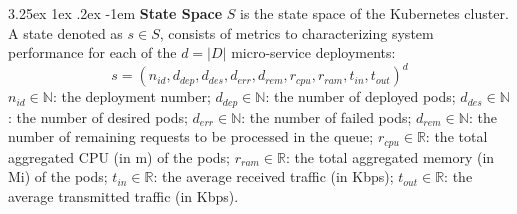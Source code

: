 \documentclass[conference]{IEEEtran}
\makeatletter
\renewcommand\paragraph{\@startsection{paragraph}{5}{\z@}%
  {3.25ex \@plus1ex \@minus.2ex}%
  {-1em}%
  {\normalfont\normalsize\bfseries}}
\makeatother
\begin{document}
\noindent \paragraph{\textbf{State Space}} $S$ is the state space of the Kubernetes cluster. A state denoted as $s \in S$, consists of metrics to characterizing system performance for each of the $d = |D|$ micro-service deployments:
$$
s = (n_{id}, d_{dep}, d_{des}, d_{err}, d_{rem}, r_{cpu}, r_{ram}, t_{in}, t_{out})^d
$$
$n_{id} \in \mathbb{N}$: the deployment number; \quad
$d_{dep} \in \mathbb{N}$: the number of deployed pods; \quad 
$d_{des} \in \mathbb{N}$: the number of desired pods; \quad
$d_{err} \in \mathbb{N}$: the number of failed pods; \quad
$d_{rem} \in \mathbb{N}$: the number of remaining requests to be processed in the queue; \quad
$r_{cpu} \in \mathbb{R}$: the total aggregated CPU (in m) of the pods; \quad
$r_{ram} \in \mathbb{R}$: the total aggregated memory (in Mi) of the pods; \quad
$t_{in} \in \mathbb{R}$: the average received traffic (in Kbps); \quad
$t_{out} \in \mathbb{R}$: the average transmitted traffic (in Kbps).

\end{document}
